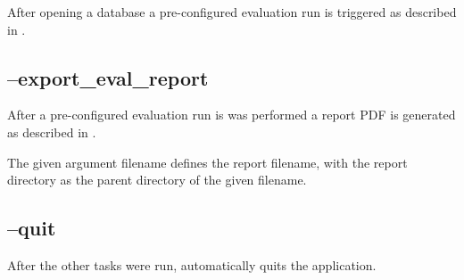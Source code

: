 After opening a database a pre-configured evaluation run is triggered as described in .

\subsection{--export\_eval\_report}

After a pre-configured evaluation run is was performed a report PDF is generated as described in .

The given argument filename defines the report filename, with the report directory as the parent directory of the given filename.

\subsection{--quit}

After the other tasks were run, automatically quits the application.


